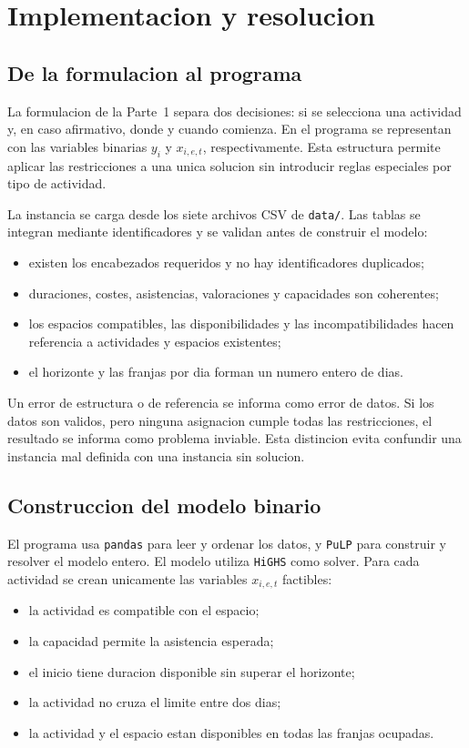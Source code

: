 \section{Implementacion y resolucion}

\subsection{De la formulacion al programa}

La formulacion de la Parte~1 separa dos decisiones: si se selecciona una actividad y,
en caso afirmativo, donde y cuando comienza. En el programa se representan con las
variables binarias $y_i$ y $x_{i,e,t}$, respectivamente. Esta estructura permite
aplicar las restricciones a una unica solucion sin introducir reglas especiales por
tipo de actividad.

La instancia se carga desde los siete archivos CSV de \texttt{data/}. Las tablas se
integran mediante identificadores y se validan antes de construir el modelo:
\begin{itemize}
\item existen los encabezados requeridos y no hay identificadores duplicados;
\item duraciones, costes, asistencias, valoraciones y capacidades son coherentes;
\item los espacios compatibles, las disponibilidades y las incompatibilidades
      hacen referencia a actividades y espacios existentes;
\item el horizonte y las franjas por dia forman un numero entero de dias.
\end{itemize}

Un error de estructura o de referencia se informa como error de datos. Si los datos
son validos, pero ninguna asignacion cumple todas las restricciones, el resultado
se informa como problema inviable. Esta distincion evita confundir una instancia mal
definida con una instancia sin solucion.

\subsection{Construccion del modelo binario}

El programa usa \texttt{pandas} para leer y ordenar los datos, y \texttt{PuLP} para
construir y resolver el modelo entero. El modelo utiliza \texttt{HiGHS} como solver.
Para cada actividad se crean unicamente las variables $x_{i,e,t}$ factibles:
\begin{itemize}
\item la actividad es compatible con el espacio;
\item la capacidad permite la asistencia esperada;
\item el inicio tiene duracion disponible sin superar el horizonte;
\item la actividad no cruza el limite entre dos dias;
\item la actividad y el espacio estan disponibles en todas las franjas ocupadas.
\end{itemize}

